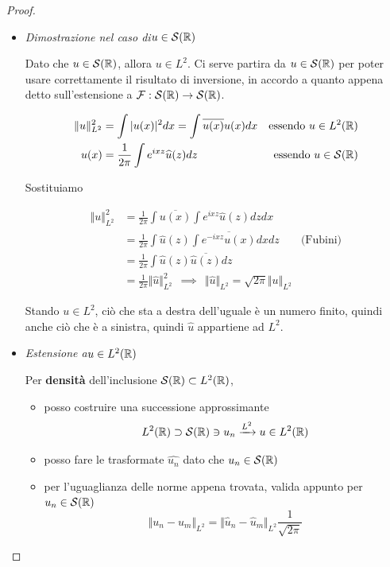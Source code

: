 \begin{proof}\leavevmode
\begin{itemize}
\item \textit{Dimostrazione nel caso di}$u\in \mathcal{S}(\mathbb{R})$

Dato che $u\in \mathcal{S}(\mathbb{R})$, allora $u\in L^{2}$. Ci serve partira da $u\in \mathcal{S}(\mathbb{R})$ per poter usare correttamente il risultato di inversione, in accordo a quanto appena detto sull'estensione a $\mathcal{F} : \mathcal{S}(\mathbb{R})\rightarrow \mathcal{S}(\mathbb{R})$.

\begin{align*}
\Vert u \Vert^{2}_{L^{2}} & = \int | u(x)|^{2} dx = \int \overline{u(x)} u(x) dx & \text{essendo} \ u\in L^{2}(\mathbb{R})\\
u(x) & = \frac{1}{2\pi}\int e^{ixz}\widehat{u}(z) dz & \text{essendo} \ u\in \mathcal{S}(\mathbb{R})
\end{align*}

Sostituiamo

\begin{align*}
\Vert u \Vert^{2}_{L^{2}} & = \frac{1}{2\pi}\int \overline{u(x)}\int e^{ixz}\hat{u}(z) dzdx & \\
 & = \frac{1}{2\pi}\int \hat{u}(z)\int \overline{e^{- ixz} u(x)} dxdz & \text{(Fubini)}\\
 & = \frac{1}{2\pi}\int \hat{u}(z)\overline{\hat{u}(z)} dz & \\
 & = \frac{1}{2\pi} \Vert \hat{u} \Vert^{2}_{L^{2}} \ \ \implies \ \ \Vert \hat{u} \Vert_{L^{2}} = \sqrt{2\pi} \Vert u \Vert_{L^{2}} &
\end{align*}

Stando $u\in L^{2}$, ciò che sta a destra dell'uguale è un numero finito, quindi anche ciò che è a sinistra, quindi $\hat{u}$ appartiene ad $L^{2}$.
\item \textit{Estensione a}$u\in L^{2}(\mathbb{R})$

Per \textbf{densità} dell'inclusione $\mathcal{S}(\mathbb{R}) \subset L^{2}(\mathbb{R})$,
\begin{itemize}
\item posso costruire una successione approssimante
\begin{equation*}
L^{2}(\mathbb{R}) \supset \mathcal{S}(\mathbb{R}) \ni u_{n}\xrightarrow{L^{2}} u\in L^{2}(\mathbb{R})
\end{equation*}
\item posso fare le trasformate $\widehat{u_{n}}$ dato che $u_{n} \in \mathcal{S}(\mathbb{R})$
\item per l'uguaglianza delle norme appena trovata, valida appunto per $u_{n} \in \mathcal{S}(\mathbb{R})$
\begin{equation*}
\Vert u_{n} - u_{m} \Vert_{L^{2}} = \Vert \hat{u}_{n} - \hat{u}_{m} \Vert_{L^{2}}\frac{1}{\sqrt{2\pi}}
\end{equation*}


\end{itemize}
\end{itemize}
\end{proof}
